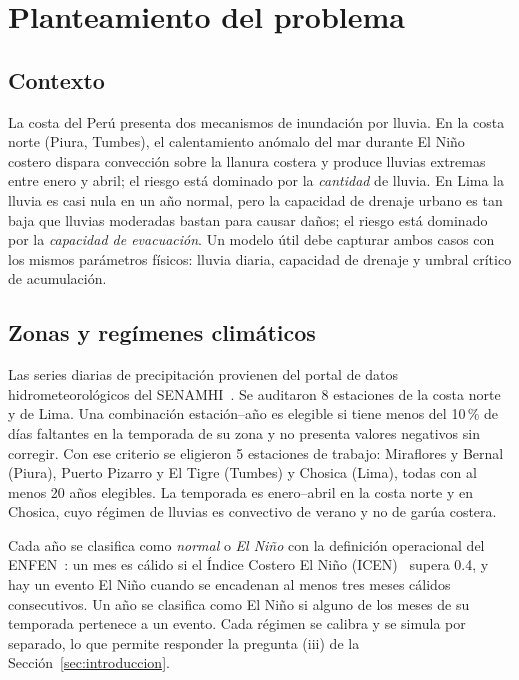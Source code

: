 \section{Planteamiento del problema}
\label{sec:problema}

\subsection{Contexto}

La costa del Perú presenta dos mecanismos de inundación por lluvia. En la costa norte (Piura, Tumbes), el calentamiento anómalo del mar durante El Niño costero dispara convección sobre la llanura costera y produce lluvias extremas entre enero y abril; el riesgo está dominado por la \emph{cantidad} de lluvia. En Lima la lluvia es casi nula en un año normal, pero la capacidad de drenaje urbano es tan baja que lluvias moderadas bastan para causar daños; el riesgo está dominado por la \emph{capacidad de evacuación}. Un modelo útil debe capturar ambos casos con los mismos parámetros físicos: lluvia diaria, capacidad de drenaje y umbral crítico de acumulación.

\subsection{Zonas y regímenes climáticos}

Las series diarias de precipitación provienen del portal de datos hidrometeorológicos del SENAMHI~\cite{senamhi}. Se auditaron 8 estaciones de la costa norte y de Lima. Una combinación estación--año es elegible si tiene menos del 10\,\% de días faltantes en la temporada de su zona y no presenta valores negativos sin corregir. Con ese criterio se eligieron 5 estaciones de trabajo: Miraflores y Bernal (Piura), Puerto Pizarro y El Tigre (Tumbes) y Chosica (Lima), todas con al menos 20 años elegibles. La temporada es enero--abril en la costa norte y en Chosica, cuyo régimen de lluvias es convectivo de verano y no de garúa costera.

Cada año se clasifica como \emph{normal} o \emph{El Niño} con la definición operacional del ENFEN~\cite{enfen2012}: un mes es cálido si el Índice Costero El Niño (ICEN)~\cite{icen} supera \num{0.4}, y hay un evento El Niño cuando se encadenan al menos tres meses cálidos consecutivos. Un año se clasifica como El Niño si alguno de los meses de su temporada pertenece a un evento. Cada régimen se calibra y se simula por separado, lo que permite responder la pregunta (iii) de la Sección~\ref{sec:introduccion}.

